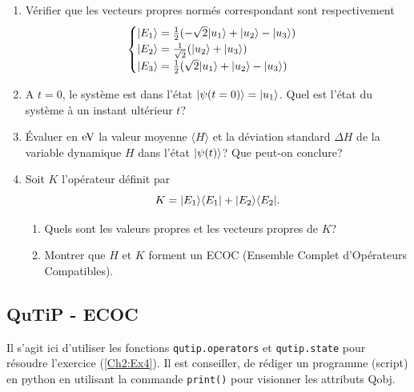 \begin{itemize}
\begin{enumerate}
\item Vérifier que les vecteurs propres normés correspondant sont
respectivement%
\begin{equation}
\begin{cases}
\vert E_1\rangle=\frac{1}{2}(-\sqrt{2}\vert u_1\rangle +\vert u_{2}\rangle-\vert u_3\rangle) \\
\vert E_{2}\rangle=\frac{1}{\sqrt{2}}(\vert u_{2}\rangle+\vert u_3\rangle) \\
\vert E_3\rangle=\frac{1}{2}(\sqrt{2}\vert u_1\rangle +\vert u_{2}\rangle-\vert u_3\rangle)
\end{cases}
\end{equation}

\item A $t=0$, le système est dans l'état $\vert\psi(t=0)\rangle=\vert u_1\rangle$. Quel
est l'état du système à un instant ultérieur $t$?

\item Évaluer en $\operatorname{eV}$ la valeur moyenne $\langle H\rangle$ et la
déviation standard $\Delta H$ de la variable dynamique $H$ dans l'état
$\vert\psi(t)\rangle$? Que peut-on conclure?

\item Soit $K$ l'opérateur définit par%
\begin{equation}
K=\vert E_1\rangle\langle E_1\vert +\vert E_{2}\rangle\langle E_{2}\vert.
\end{equation}

\begin{enumerate}
\item Quels sont les valeurs propres et les vecteurs propres de $K$?

\item Montrer que $H$ et $K$ forment un ECOC (Ensemble Complet d'Opérateurs
Compatibles).
\end{enumerate}
\end{enumerate}

\subsection{QuTiP - ECOC}

Il s'agit ici d'utiliser les fonctions \texttt{qutip.operators} et 
\texttt{qutip.state} pour résoudre l'exercice (\ref{Ch2:Ex4}). Il est  
conseiller, de rédiger un programme (script) en python en utilisant la commande 
\texttt{print()} pour visionner les attributs Qobj.


\end{itemize}
